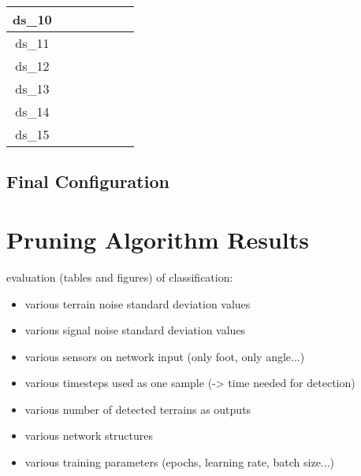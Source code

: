 \begin{table}[H]
\begin{tabular}{|c|c|c|c|c|c|c|}
ds\_10                            &                   &                    &                 &                   &                    &                 \\ \hline
ds\_11                            &                   &                    &                 &                   &                    &                 \\ \hline
ds\_12                            &                   &                    &                 &                   &                    &                 \\ \hline
ds\_13                            &                   &                    &                 &                   &                    &                 \\ \hline
ds\_14                            &                   &                    &                 &                   &                    &                 \\ \hline
ds\_15                            &                   &                    &                 &                   &                    &                 \\ \hline
\end{tabular}
\end{table}

\subsection{Final Configuration} \label{ssec:final_configuration}

\section{Pruning Algorithm Results} \label{sec:pruning_algorithm_results}

evaluation (tables and figures) of classification:
\begin{itemize}
\item various terrain noise standard deviation values
\item various signal noise standard deviation values
\item various sensors on network input (only foot, only angle...)
\item various timesteps used as one sample (-> time needed for detection)
\item various number of detected terrains as outputs
\item various network structures
\item various training parameters (epochs, learning rate, batch size...)
\end{itemize}



